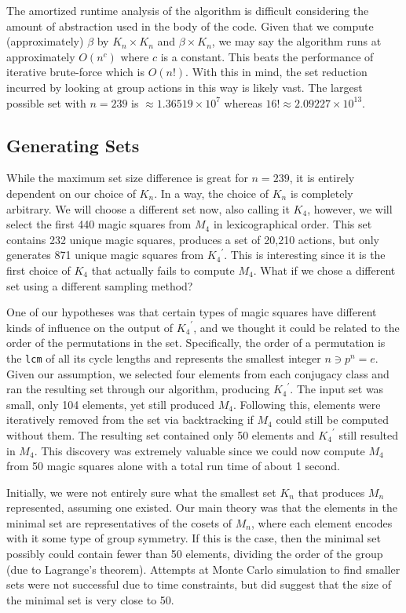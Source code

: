 \documentclass{rhumj_new}
\begin{document}
The amortized runtime analysis of the algorithm is difficult considering the amount of
abstraction used in the body of the code. Given that we compute (approximately) $\beta$ by $K_n
  \times K_n$ and $\beta \times K_n$, we may say the algorithm runs at approximately
$O\left(n^c\right)$ where $c$ is a constant. This beats the performance of iterative brute-force
which is
$O\left(n!\right)$. With this in mind, the set reduction incurred by looking at group actions in
this way is likely vast. The largest possible set with $n=239$ is $\approx 1.36519 \times 10^7$
whereas $16!\approx 2.09227 \times 10^{13}$.

\subsection{Generating Sets}

While the maximum set size difference is great for $n=239$, it is entirely dependent on our
choice of $K_n$. In a way, the choice of $K_n$ is completely arbitrary. We will choose a different
set now, also calling it $K_4$, however, we will select the first 440 magic squares from $M_4$ in
lexicographical order. This set contains 232 unique magic squares, produces a set of 20,210
actions, but only generates 871 unique magic squares from ${K_4}^\prime$. This is interesting since
it
is the first choice of $K_4$ that actually fails to compute $M_4$. What if we chose a different set
using a different sampling method?

One of our hypotheses was that certain types of magic squares have different kinds of
influence on the output of ${K_4}^\prime$, and we thought it could be related to the order of the
permutations in the set. Specifically, the order of a permutation is the \texttt{lcm} of all its
cycle lengths and represents the smallest integer $n \ni p^n = e$. Given our assumption, we
selected four elements from each conjugacy class and ran the resulting set through our algorithm,
producing ${K_4}^\prime$. The input set was small, only 104 elements, yet still produced $M_4$.
Following this, elements were iteratively removed from the set via backtracking if $M_4$ could
still be computed without them. The resulting set contained only 50 elements and ${K_4}^\prime$
still resulted in $M_4$. This discovery was extremely valuable since we could now compute $M_4$
from 50 magic squares alone with a total run time of about 1 second.

Initially, we were not entirely sure what the smallest set $K_n$ that produces $M_n$
represented, assuming one existed. Our main theory was that the elements in the minimal set are
representatives of the cosets of $M_n$, where each element encodes with it some type of group
symmetry. If this is the case, then the minimal set possibly could contain fewer than 50 elements,
dividing the order of the group (due to Lagrange's theorem). Attempts at Monte Carlo simulation to
find smaller sets were not successful due to time constraints, but did suggest that the size of the
minimal set is very close to 50.
\end{document}
